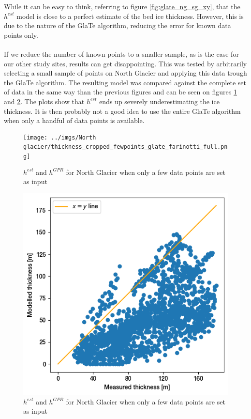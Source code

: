 \documentclass[a4, 12pt]{article}
\begin{document}
While it can be easy to think, referring to figure \ref{fig:glate_ng_sg_xy}, that the $h^{est}$ model is close to a perfect estimate of the bed ice thickness. However, this is due to the nature of the GlaTe algorithm, reducing the error for known data points only.
\\
\\
If we reduce the number of known points to a smaller sample, as is the case for our other study sites, results can get disappointing. This was tested by arbitrarily selecting a small sample of points on North Glacier and applying this data trough the GlaTe algorithm. The resulting model was compared against the complete set of data in the same way than the previous figures and can be seen on figures \ref{fig:ng_fewpoints_thickness} and \ref{fig:ng_fewpoints_xy}. The plots show that $h^{est}$ ends up severely underestimating the ice thickness. It is then probably not a good idea to use the entire GlaTe algorithm when only a handful of data points is available.

\begin{figure}[h!]
\centering
\texttt{[image: ../imgs/North glacier/thickness\_cropped\_fewpoints\_glate\_farinotti\_full.png]}
\caption{$h^{est}$ and $h^{GPR}$ for North Glacier when only a few data points are set as input}
\label{fig:ng_fewpoints_thickness}
\end{figure}

\begin{figure}[h!]
\centering
\includegraphics[scale=0.5]{../imgs/North glacier/xy_scatter_fewpoints_glate_farinotti_full.png}
\caption{$h^{est}$ and $h^{GPR}$ for North Glacier when only a few data points are set as input}
\label{fig:ng_fewpoints_xy}
\end{figure}
\end{document}
